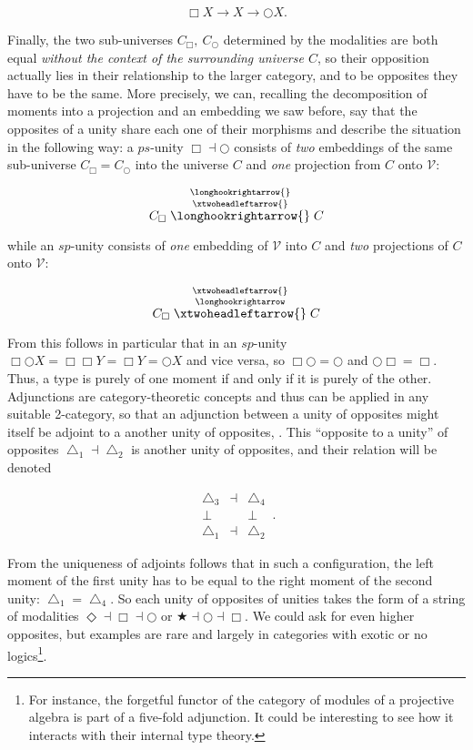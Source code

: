 \documentclass{article}
\begin{document}
$$\Box X\rightarrow X \rightarrow\bigcirc X.$$

Finally, the two sub-universes $C_\Box ,\ C_\bigcirc$ determined by the modalities are both equal \emph{without
the context of the surrounding universe $C$}, so their opposition actually lies in their relationship
to the larger category, and to be opposites they have to be the same. More precisely, we can, recalling
the decomposition of moments into a projection and an embedding we saw before, say that the opposites
of a unity share each one of their morphisms and describe the situation in the following way: a $ps$-unity
$\Box\dashv\bigcirc$ consists of \emph{two} embeddings of the same sub-universe $C_\Box=C_\bigcirc$ into
the universe $C$ and \emph{one} projection from $C$ onto $\mathcal{V}$:

$$C_\Box\stackrel{\longhookrightarrow{}}{\stackrel{\xtwoheadleftarrow{}}{\longhookrightarrow{}}}C$$

while an $sp$-unity consists of \emph{one} embedding of $\mathcal{V}$ into $C$ and \emph{two} projections
of $C$ onto $\mathcal{V}$:

$$C_\Box\stackrel{\xtwoheadleftarrow{}}{\stackrel{\longhookrightarrow}{\xtwoheadleftarrow{}}}C$$

From this follows in particular that in an $sp$-unity $\Box\bigcirc X=\Box\Box Y=\Box Y= \bigcirc X$ and
vice versa, so $\Box\bigcirc=\bigcirc$ and $\bigcirc\Box=\Box$. Thus, a type is purely of one moment if
and only if it is purely of the other. \\

Adjunctions are category-theoretic concepts and thus can be applied in any suitable 2-category, so that
an adjunction between a unity of opposites might itself be adjoint to a another unity of opposites, \cite{Shu}.
This ``opposite to a unity'' of opposites $\bigtriangleup_1\dashv\bigtriangleup_2$ is another unity of
opposites, and their relation will be denoted 


$$
  \begin{array}{ccc}
    \bigtriangleup_3 &\dashv& \bigtriangleup_4
    \\
    \bot & & \bot
    \\
    \bigtriangleup_1 &\dashv& \bigtriangleup_2
    \end{array}
  \,.
$$

From the uniqueness of adjoints follows that in such a configuration, the left moment of the first unity
has to be equal to the right moment of the second unity: $\bigtriangleup_1=\bigtriangleup_4$. So each
unity of opposites of unities takes the form of a string of modalities $\Diamond\dashv\Box\dashv\bigcirc$
or $\bigstar\dashv\bigcirc\dashv\Box$. We could ask for even higher opposites, but examples are rare and
largely in categories with exotic or no logics\footnote{For instance, the forgetful functor of the category
of modules of a projective algebra is part of a five-fold adjunction. It could be interesting to see how
it interacts with their internal type theory.}. \\
\end{document}
